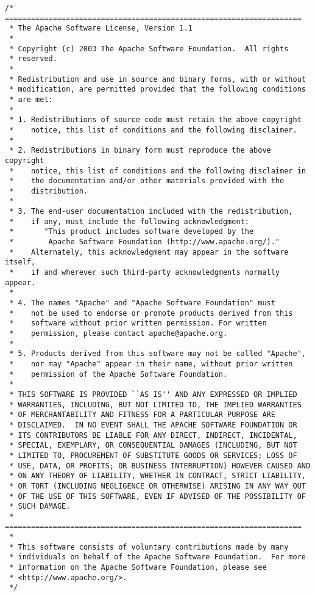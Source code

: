 

\footnotesize\begin{verbatim}/* ====================================================================
 * The Apache Software License, Version 1.1
 *
 * Copyright (c) 2003 The Apache Software Foundation.  All rights
 * reserved.
 *
 * Redistribution and use in source and binary forms, with or without
 * modification, are permitted provided that the following conditions
 * are met:
 *
 * 1. Redistributions of source code must retain the above copyright
 *    notice, this list of conditions and the following disclaimer.
 *
 * 2. Redistributions in binary form must reproduce the above copyright
 *    notice, this list of conditions and the following disclaimer in
 *    the documentation and/or other materials provided with the
 *    distribution.
 *
 * 3. The end-user documentation included with the redistribution,
 *    if any, must include the following acknowledgment:
 *       "This product includes software developed by the
 *        Apache Software Foundation (http://www.apache.org/)."
 *    Alternately, this acknowledgment may appear in the software itself,
 *    if and wherever such third-party acknowledgments normally appear.
 *
 * 4. The names "Apache" and "Apache Software Foundation" must
 *    not be used to endorse or promote products derived from this
 *    software without prior written permission. For written
 *    permission, please contact apache@apache.org.
 *
 * 5. Products derived from this software may not be called "Apache",
 *    nor may "Apache" appear in their name, without prior written
 *    permission of the Apache Software Foundation.
 *
 * THIS SOFTWARE IS PROVIDED ``AS IS'' AND ANY EXPRESSED OR IMPLIED
 * WARRANTIES, INCLUDING, BUT NOT LIMITED TO, THE IMPLIED WARRANTIES
 * OF MERCHANTABILITY AND FITNESS FOR A PARTICULAR PURPOSE ARE
 * DISCLAIMED.  IN NO EVENT SHALL THE APACHE SOFTWARE FOUNDATION OR
 * ITS CONTRIBUTORS BE LIABLE FOR ANY DIRECT, INDIRECT, INCIDENTAL,
 * SPECIAL, EXEMPLARY, OR CONSEQUENTIAL DAMAGES (INCLUDING, BUT NOT
 * LIMITED TO, PROCUREMENT OF SUBSTITUTE GOODS OR SERVICES; LOSS OF
 * USE, DATA, OR PROFITS; OR BUSINESS INTERRUPTION) HOWEVER CAUSED AND
 * ON ANY THEORY OF LIABILITY, WHETHER IN CONTRACT, STRICT LIABILITY,
 * OR TORT (INCLUDING NEGLIGENCE OR OTHERWISE) ARISING IN ANY WAY OUT
 * OF THE USE OF THIS SOFTWARE, EVEN IF ADVISED OF THE POSSIBILITY OF
 * SUCH DAMAGE.
 * ====================================================================
 *
 * This software consists of voluntary contributions made by many
 * individuals on behalf of the Apache Software Foundation.  For more
 * information on the Apache Software Foundation, please see
 * <http://www.apache.org/>.
 */
\end{verbatim}\normalsize
